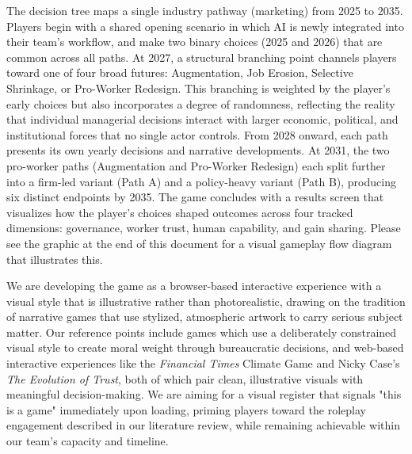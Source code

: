 \documentclass[sigconf,authordraft]{acmart}
\begin{document}
The decision tree maps a single industry pathway (marketing) from 2025 to 2035. Players begin with a shared opening scenario in which AI is newly integrated into their team's workflow, and make two binary choices (2025 and 2026) that are common across all paths. At 2027, a structural branching point channels players toward one of four broad futures: Augmentation, Job Erosion, Selective Shrinkage, or Pro-Worker Redesign. This branching is weighted by the player's early choices but also incorporates a degree of randomness, reflecting the reality that individual managerial decisions interact with larger economic, political, and institutional forces that no single actor controls. From 2028 onward, each path presents its own yearly decisions and narrative developments. At 2031, the two pro-worker paths (Augmentation and Pro-Worker Redesign) each split further into a firm-led variant (Path A) and a policy-heavy variant (Path B), producing six distinct endpoints by 2035. The game concludes with a results screen that visualizes how the player's choices shaped outcomes across four tracked dimensions: governance, worker trust, human capability, and gain sharing. Please see the graphic at the end of this document for a visual gameplay flow diagram that illustrates this.

We are developing the game as a browser-based interactive experience with a visual style that is illustrative rather than photorealistic, drawing on the tradition of narrative games that use stylized, atmospheric artwork to carry serious subject matter. Our reference points include games which use a deliberately constrained visual style to create moral weight through bureaucratic decisions, and web-based interactive experiences like the \textit{Financial Times} Climate Game and Nicky Case's \textit{The Evolution of Trust}, both of which pair clean, illustrative visuals with meaningful decision-making. We are aiming for a visual register that signals "this is a game" immediately upon loading, priming players toward the roleplay engagement described in our literature review, while remaining achievable within our team's capacity and timeline.
\end{document}
